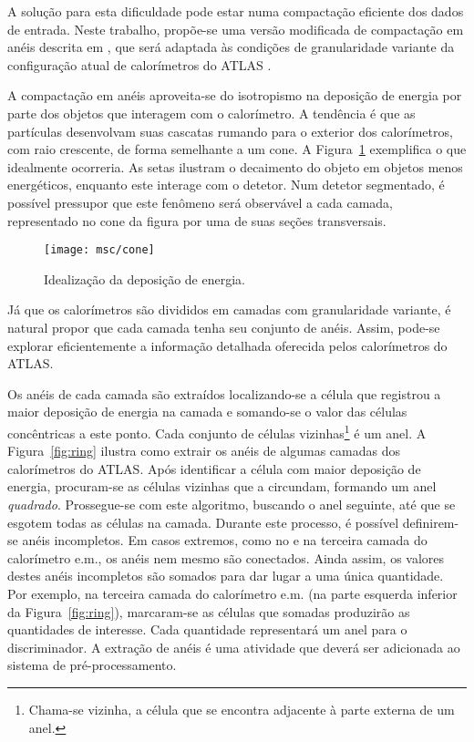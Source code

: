 A solução para esta dificuldade pode estar numa compactação eficiente dos
dados de entrada. Neste trabalho, propõe-se uma versão modificada de
compactação em anéis descrita em \cite{seixas:sp}, que será adaptada às
condições de granularidade variante da configuração atual de calorímetros do
ATLAS \cite{aa:nima-2003}.

A compactação em anéis \cite{seixas:perf-loss, seixas:sp} aproveita-se do
isotropismo na deposição de energia por parte dos objetos que interagem com o
calorímetro. A tendência é que as partículas desenvolvam suas cascatas rumando
para o exterior dos calorímetros, com raio crescente, de forma semelhante a um
cone. A Figura~\ref{fig:cone} exemplifica o que idealmente ocorreria. As setas
ilustram o decaimento do objeto em objetos menos energéticos, enquanto este
interage com o detetor. Num detetor segmentado, é possível pressupor que este
fenômeno será observável a cada camada, representado no cone da figura por uma
de suas seções transversais.

\begin{figure}
\begin{center}
\texttt{[image: msc/cone]}
\end{center}
\caption{Idealização da deposição de energia.}
\label{fig:cone}
\end{figure}

Já que os calorímetros são divididos em camadas com granularidade variante, é
natural propor que cada camada tenha seu conjunto de anéis. Assim, pode-se
explorar eficientemente a informação detalhada oferecida pelos calorímetros do
ATLAS.

Os anéis de cada camada são extraídos localizando-se a célula que registrou a
maior deposição de energia na camada e somando-se o valor das células
concêntricas a este ponto. Cada conjunto de células vizinhas\footnote{Chama-se
vizinha, a célula que se encontra adjacente à parte externa de um anel.} é um
anel. A Figura~\ref{fig:ring} ilustra como extrair os anéis de algumas camadas
dos calorímetros do ATLAS. Após identificar a célula com maior deposição de
energia, procuram-se as células vizinhas que a circundam, formando um anel
\emph{quadrado}. Prossegue-se com este algoritmo, buscando o anel seguinte, até
que se esgotem todas as células na camada. Durante este processo, é possível
definirem-se anéis incompletos. Em casos extremos, como no  e
na terceira camada do calorímetro e.m., os anéis nem mesmo são
conectados. Ainda assim, os valores destes anéis incompletos são somados para
dar lugar a uma única quantidade. Por exemplo, na terceira camada do
calorímetro e.m. (na parte esquerda inferior da Figura~\ref{fig:ring}),
marcaram-se as células que somadas produzirão as quantidades de
interesse. Cada quantidade representará um anel para o discriminador. A
extração de anéis é uma atividade que deverá ser adicionada ao sistema de
pré-processamento.


